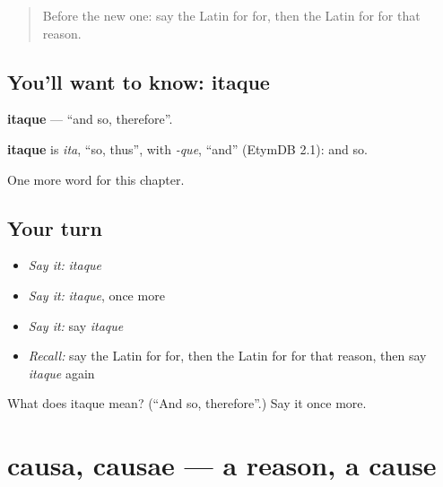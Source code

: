 \label{lesson:LA-C113-itaque}



\begin{quote}
Before the new one: say the Latin for for, then the Latin for for that reason.
\end{quote}

\subsection*{You'll want to know: itaque}
\textbf{itaque} — \textquotedblleft{}and so, therefore\textquotedblright{}.

\begin{cousinweb}
\textbf{itaque} is \emph{ita}, \textquotedblleft{}so, thus\textquotedblright{}, with \emph{-que}, \textquotedblleft{}and\textquotedblright{} (EtymDB 2.1): and so.
\end{cousinweb}

\begin{grammarlens}[title={What you've built}]
One more word for this chapter.
\end{grammarlens}

\subsection*{Your turn}
\begin{itemize}
\raggedright
  \item \emph{Say it:} \emph{itaque}
  \item \emph{Say it:} \emph{itaque}, once more
  \item \emph{Say it:} say \emph{itaque}
  \item \emph{Recall:} say the Latin for for, then the Latin for for that reason, then say \emph{itaque} again
\end{itemize}

\begin{tcolorbox}[breakable,colback=teal!4,colframe=teal!35!black,title={Before you move on}]
What does itaque mean? (\textquotedblleft{}And so, therefore\textquotedblright{}.) Say it once more.
\end{tcolorbox}
\section[causa, causae]{causa, causae — a reason, a cause}

\label{lesson:LA-C113-causa}




